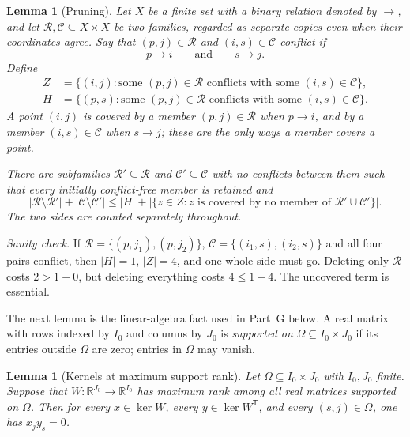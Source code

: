 \documentclass[11pt]{article}
\newtheorem{lemma}[theorem]{Lemma}
\theoremstyle{remark}
\newcommand{\abs}[1]{\lvert #1\rvert}
\newcommand{\R}{\mathbb R}
\begin{document}
\begin{lemma}[Pruning]\label{lem:pruning}
Let $X$ be a finite set with a binary relation denoted by $\to$, and let
$\mathcal R,\mathcal C\subseteq X\times X$ be two families, regarded as
separate copies even when their coordinates agree.  Say that
$(p,j)\in\mathcal R$ and $(i,s)\in\mathcal C$ \emph{conflict} if
\[
 p\to i\qquad\text{and}\qquad s\to j.
\]
Define
\begin{align*}
 Z&=\{(i,j):\text{some }(p,j)\in\mathcal R
       \text{ conflicts with some }(i,s)\in\mathcal C\},\\
 H&=\{(p,s):\text{some }(p,j)\in\mathcal R
       \text{ conflicts with some }(i,s)\in\mathcal C\}.
\end{align*}
A point $(i,j)$ is \emph{covered} by a member $(p,j)\in\mathcal R$ when
$p\to i$, and by a member $(i,s)\in\mathcal C$ when $s\to j$; these are the
only ways a member covers a point.

There are subfamilies $\mathcal R'\subseteq\mathcal R$ and
$\mathcal C'\subseteq\mathcal C$ with no conflicts between them such that
every initially conflict-free member is retained and
\begin{equation}\label{eq:pruning-bound}
 \abs{\mathcal R\setminus\mathcal R'}+
 \abs{\mathcal C\setminus\mathcal C'}
 \leq \abs H+
 \abs{\{z\in Z:z\text{ is covered by no member of }
                    \mathcal R'\cup\mathcal C'\}}.
\end{equation}
The two sides are counted separately throughout.
\end{lemma}

\emph{Sanity check.}  If $\mathcal R=\{(p,j_1),(p,j_2)\}$,
$\mathcal C=\{(i_1,s),(i_2,s)\}$ and all four pairs conflict, then
$\abs H=1$, $\abs Z=4$, and one whole side must go.  Deleting only
$\mathcal R$ costs $2>1+0$, but deleting everything costs $4\le1+4$.  The
uncovered term is essential.

The next lemma is the linear-algebra fact used in Part~G below.  A real
matrix with rows indexed by $I_0$ and columns by $J_0$ is \emph{supported on}
$\Omega\subseteq I_0\times J_0$ if its entries outside $\Omega$ are zero;
entries in $\Omega$ may vanish.

\begin{lemma}[Kernels at maximum support rank]\label{lem:kernel-support}
Let $\Omega\subseteq I_0\times J_0$ with $I_0,J_0$ finite.  Suppose that
$W:\R^{J_0}\to\R^{I_0}$ has maximum rank among all real matrices supported
on $\Omega$.  Then for every $x\in\ker W$, every $y\in\ker W^{\mathsf T}$,
and every $(s,j)\in\Omega$, one has $x_jy_s=0$.
\end{lemma}
\end{document}
